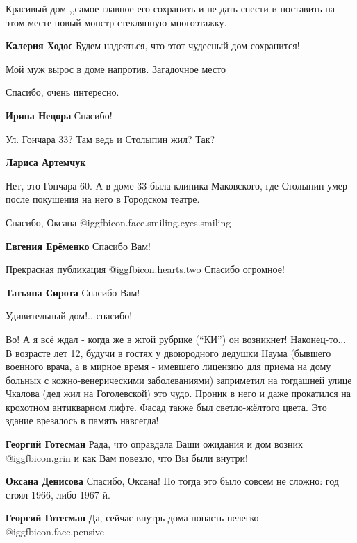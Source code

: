 \begin{itemize}
Красивый дом ,,самое главное его сохранить и не дать снести и поставить на этом месте новый монстр стеклянную многоэтажку.

\textbf{Калерия Ходос} Будем надеяться, что этот чудесный дом сохранится!

Мой муж вырос в доме напротив. Загадочное место

Спасибо, очень интересно.

\textbf{Ирина Нецора} Спасибо!

Ул. Гончара 33?
Там ведь и Столыпин жил? Так?

\textbf{Лариса Артемчук} 

Нет, это Гончара 60. А в доме 33 была клиника Маковского, где Столыпин умер
после покушения на него в Городском театре.

Спасибо, Оксана  @igg{fbicon.face.smiling.eyes.smiling} 

\textbf{Евгения Ерёменко} Спасибо Вам!


Прекрасная публикация @igg{fbicon.hearts.two} 
Спасибо огромное!

\textbf{Татьяна Сирота} Спасибо Вам!

Удивительный дом!.. спасибо!


Во! А я всё ждал - когда же в жтой рубрике (\enquote{КИ}) он возникнет! Наконец-то... В
возрасте лет 12, будучи в гостях у двоюродного дедушки Наума (бывшего военного
врача, а в мирное время - имевшего лицензию для приема на дому больных с
кожно-венерическими заболеваниями) заприметил на тогдашней улице Чкалова (дед
жил на Гоголевской) это чудо. Проник в него и даже прокатился на крохотном
антикварном лифте. Фасад также был светло-жёлтого цвета. Это здание врезалось в
память навсегда!

\begin{itemize} %
\textbf{Георгий Готесман} Рада, что оправдала Ваши ожидания и дом возник @igg{fbicon.grin}  и как Вам повезло, что Вы были внутри!

\textbf{Оксана Денисова} Спасибо, Оксана! Но тогда это было совсем не сложно: год стоял 1966, либо 1967-й.

\textbf{Георгий Готесман} Да, сейчас внутрь дома попасть нелегко  @igg{fbicon.face.pensive} 


\end{itemize}
\end{itemize}
